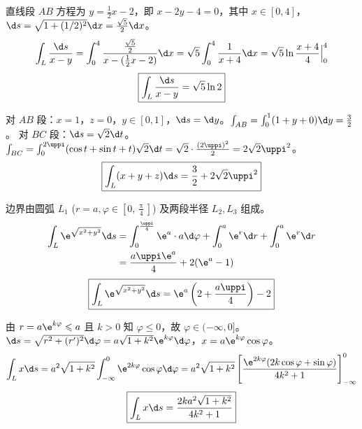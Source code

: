 \begin{solution}

    直线段 $AB$ 方程为 $y = \frac{1}{2}x - 2$，即 $x-2y-4=0$，其中 $x \in [0, 4]$，$\d s = \sqrt{1+(1/2)^{2}} \d x = \frac{\sqrt{5}}{2} \d x$。
    \begin{equation}
        \int_{L} \frac{\d s}{x-y} = \int_{0}^{4} \frac{\frac{\sqrt{5}}{2}}{x - (\frac{1}{2}x - 2)} \d x = \sqrt{5} \int_{0}^{4} \frac{1}{x+4} \d x = \sqrt{5} \ln \frac{x+4}{4} \Big|_{0}^{4}
    \end{equation}
    \begin{equation}
        \boxed{\int_{L} \frac{\d s}{x-y} = \sqrt{5} \ln 2}
    \end{equation}


    对 $AB$ 段：$x=1$，$z=0$，$y \in [0, 1]$，$\d s = \d y$。$\int_{AB} = \int_{0}^{1}(1+y+0) \d y = \frac{3}{2}$。
    对 $BC$ 段：$\d s = \sqrt{2} \d t$。$\int_{BC} = \int_{0}^{2 \uppi}(\cos t + \sin t + t) \sqrt{2} \d t = \sqrt{2} \cdot \frac{(2 \uppi)^{2}}{2} = 2 \sqrt{2} \uppi^{2}$。
    \begin{equation}
        \boxed{\int_{L}(x+y+z) \d s = \frac{3}{2} + 2 \sqrt{2} \uppi^{2}}
    \end{equation}


    边界由圆弧 $L_{1}$ ($r=a, \varphi \in [0, \frac{\uppi}{4}]$) 及两段半径 $L_{2}, L_{3}$ 组成。
    \begin{equation}
        \begin{aligned}
            \int_{L} \e^{\sqrt{x^{2}+y^{2}}} \d s & = \int_{0}^{\frac{\uppi}{4}} \e^{a} \cdot a \d \varphi + \int_{0}^{a} \e^{r} \d r + \int_{0}^{a} \e^{r} \d r \\
                                                  & = \frac{a \uppi \e^{a}}{4} + 2(\e^{a}-1)
        \end{aligned}
    \end{equation}
    \begin{equation}
        \boxed{\int_{L} \e^{\sqrt{x^{2}+y^{2}}} \d s = \e^{a}\left(2 + \frac{a \uppi}{4}\right) - 2}
    \end{equation}


    由 $r = a \e^{k \varphi} \leqslant a$ 且 $k>0$ 知 $\varphi \leqslant 0$，故 $\varphi \in (-\infty, 0]$。
    $\d s = \sqrt{r^{2} + (r')^{2}} \d \varphi = a \sqrt{1+k^{2}} \e^{k \varphi} \d \varphi$，$x = a \e^{k \varphi} \cos \varphi$。
    \begin{equation}
        \int_{L} x \d s = a^{2} \sqrt{1+k^{2}} \int_{-\infty}^{0} \e^{2k \varphi} \cos \varphi \d \varphi = a^{2} \sqrt{1+k^{2}} \left[ \frac{\e^{2k \varphi}(2k \cos \varphi + \sin \varphi)}{4k^{2}+1} \right]_{-\infty}^{0}
    \end{equation}
    \begin{equation}
        \boxed{\int_{L} x \d s = \frac{2 k a^{2} \sqrt{1+k^{2}}}{4 k^{2}+1}}
    \end{equation}


\end{solution}

